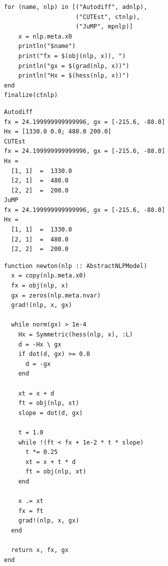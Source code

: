 \begin{frame}[fragile,t]

\begin{minipage}{0.52\textwidth}
\begin{lstlisting}
for (name, nlp) in [("Autodiff", adnlp),
                    ("CUTEst", ctnlp),
                    ("JuMP", mpnlp)]
    x = nlp.meta.x0
    println("$name")
    print("fx = $(obj(nlp, x)), ")
    println("gx = $(grad(nlp, x))")
    println("Hx = $(hess(nlp, x))")
end
finalize(ctnlp)
\end{lstlisting}
\end{minipage}
\begin{minipage}{0.48\textwidth}
\begin{lstlisting}
Autodiff
fx = 24.199999999999996, gx = [-215.6, -88.0]
Hx = [1330.0 0.0; 480.0 200.0]
CUTEst
fx = 24.199999999999996, gx = [-215.6, -88.0]
Hx = 
  [1, 1]  =  1330.0
  [2, 1]  =  480.0
  [2, 2]  =  200.0
JuMP
fx = 24.199999999999996, gx = [-215.6, -88.0]
Hx = 
  [1, 1]  =  1330.0
  [2, 1]  =  480.0
  [2, 2]  =  200.0
\end{lstlisting}
\end{minipage}
\end{frame}

\begin{frame}
\begin{lstlisting}
function newton(nlp :: AbstractNLPModel)
  x = copy(nlp.meta.x0)
  fx = obj(nlp, x)
  gx = zeros(nlp.meta.nvar)
  grad!(nlp, x, gx)

  while norm(gx) > 1e-4
    Hx = Symmetric(hess(nlp, x), :L)
    d = -Hx \ gx
    if dot(d, gx) >= 0.0
      d = -gx
    end

    xt = x + d
    ft = obj(nlp, xt)
    slope = dot(d, gx)

    t = 1.0
    while !(ft < fx + 1e-2 * t * slope)
      t *= 0.25
      xt = x + t * d
      ft = obj(nlp, xt)
    end

    x .= xt
    fx = ft
    grad!(nlp, x, gx)
  end

  return x, fx, gx
end
\end{lstlisting}
\end{frame}

